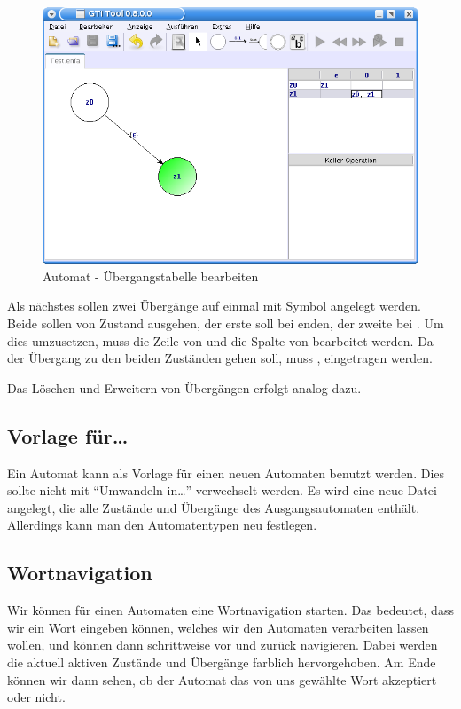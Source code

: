 \begin{figure}[h]
\begin{center}
\includegraphics[width=12cm]{images/machine_table.png}
\caption{Automat - Übergangstabelle bearbeiten}
\end{center}
\end{figure}

Als nächstes sollen zwei Übergänge auf einmal mit Symbol  angelegt
werden. Beide sollen von Zustand  ausgehen, der erste soll bei
 enden, der zweite bei . Um dies umzusetzen, muss die Zeile
von  und die Spalte von  bearbeitet werden. Da der Übergang
zu den beiden Zuständen gehen soll, muss ,  eingetragen
werden.\vspace{10pt}

Das Löschen und Erweitern von Übergängen erfolgt analog dazu.


\subsection{Vorlage für\ldots}
  
  Ein Automat kann als Vorlage für einen neuen Automaten benutzt werden. Dies
  sollte nicht mit "`Umwandeln in\ldots"' verwechselt werden. Es wird eine neue
  Datei angelegt, die alle Zustände und Übergänge des Ausgangsautomaten enthält.
  Allerdings kann man den Automatentypen neu festlegen.
  
\subsection{Wortnavigation}
  
  Wir können für einen Automaten eine Wortnavigation starten. Das bedeutet, dass
  wir ein Wort eingeben können, welches wir den Automaten verarbeiten lassen
  wollen, und können dann schrittweise vor und zurück navigieren. Dabei
  werden die aktuell aktiven Zustände und Übergänge farblich hervorgehoben. Am Ende können
  wir dann sehen, ob der Automat das von uns gewählte Wort akzeptiert oder
  nicht.\vspace{10pt}
  
